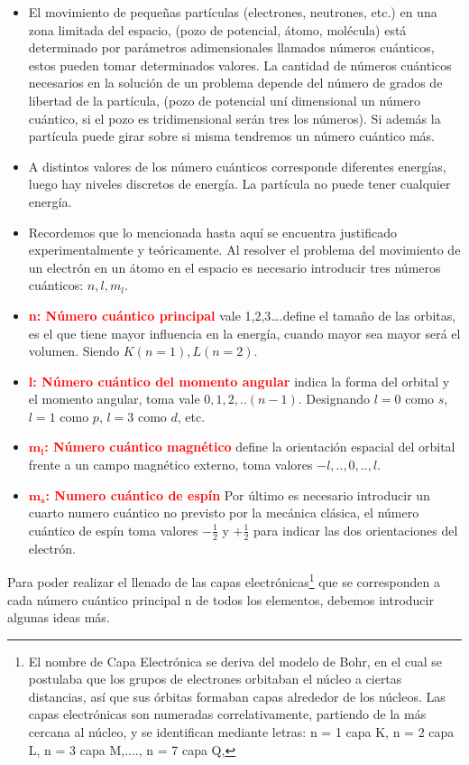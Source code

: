 \begin{itemize}
	\item El movimiento de pequeñas partículas (electrones, neutrones, etc.) en una zona limitada del espacio, (pozo de potencial, átomo, molécula) está determinado por parámetros adimensionales llamados números cuánticos, estos pueden tomar determinados valores. La cantidad de números cuánticos necesarios en la solución de un problema depende del número de grados de libertad de la partícula, (pozo de potencial uní dimensional un número cuántico, si el pozo es tridimensional serán tres los números). Si además la partícula puede girar sobre si misma tendremos un número cuántico más.
	\item A distintos valores de los número cuánticos corresponde diferentes energías, luego hay niveles discretos de energía. La partícula no puede tener cualquier energía.
	\item Recordemos que lo mencionada hasta aquí se encuentra justificado experimentalmente y teóricamente. Al resolver el problema del movimiento de un electrón en un átomo en el espacio es necesario introducir tres números cuánticos: $n, l, m_{l}$.
	\item  \textcolor{red}{\textbf{n: Número cuántico principal}} vale 1,2,3….define el tamaño de las orbitas, es el que tiene mayor influencia en la energía, cuando mayor sea mayor será el volumen. Siendo $K (n=1), L(n=2)$.
	\item \textcolor{red}{\textbf{l: Número cuántico del momento angular}} indica la forma del orbital y el momento angular, toma vale $0 ,1, 2,.. (n -1)$. Designando $l=0$ como $s$, $l=1$ como $p$, $l=3$ como $d$, etc.
	\item  \textcolor{red}{\textbf{$\boldsymbol{m_{l}}$: Número cuántico magnético}} define la orientación espacial del orbital frente a un campo magnético externo, toma valores $-l,..,0,..,l$.
	\item \textcolor{red}{\textbf{$\boldsymbol{m_{s}}$: Numero cuántico de espín}} Por último es necesario introducir un cuarto numero cuántico no previsto por la mecánica clásica, el número cuántico de espín toma valores $-\frac{1}{2}$ y $+\frac{1}{2}$ para indicar las dos orientaciones del electrón.
\end{itemize}

Para poder realizar el llenado de las capas electrónicas\footnote{El nombre de Capa Electrónica se deriva del modelo de Bohr, en el cual se postulaba que los grupos de electrones orbitaban el núcleo a ciertas distancias, así que sus órbitas formaban capas alrededor de los núcleos. Las capas electrónicas son numeradas correlativamente, partiendo de la más cercana al núcleo, y se identifican mediante letras: n = 1 capa K, n = 2 capa L, n = 3 capa M,...., n = 7 capa Q,} que se corresponden a cada número cuántico principal n de todos los elementos, debemos introducir algunas ideas más.

